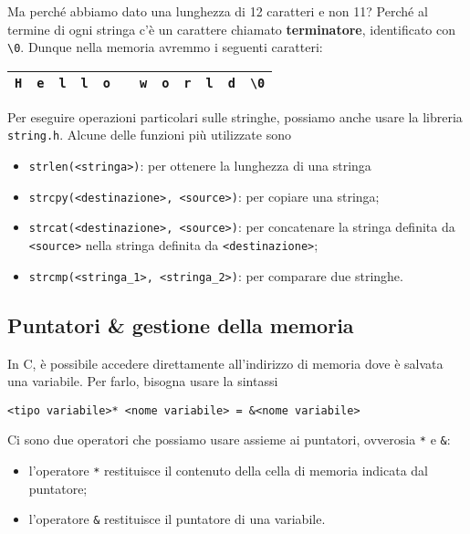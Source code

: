Ma perché abbiamo dato una lunghezza di 12 caratteri e non 11? Perché al termine di ogni stringa c'è un carattere chiamato \textbf{terminatore}, identificato con \verb|\0|. Dunque nella memoria avremmo i seguenti caratteri:

\begin{center}
    \begin{tabular}{|c|c|c|c|c|c|c|c|c|c|c|c|}
        \hline
        \verb|H| & \verb|e| & \verb|l| & \verb|l| & \verb|o| & & \verb|w| & \verb|o| & \verb|r| & \verb|l| & \verb|d| & \verb|\0| \\
        \hline
    \end{tabular}
\end{center}

Per eseguire operazioni particolari sulle stringhe, possiamo anche usare la libreria \verb|string.h|. Alcune delle funzioni più utilizzate sono \begin{itemize}
    \item \verb|strlen(<stringa>)|: per ottenere la lunghezza di una stringa
    \item \verb|strcpy(<destinazione>, <source>)|: per copiare una stringa;
    \item \verb|strcat(<destinazione>, <source>)|: per concatenare la stringa definita da \verb|<source>| nella stringa definita da \verb|<destinazione>|;
    \item \verb|strcmp(<stringa_1>, <stringa_2>)|: per comparare due stringhe.
\end{itemize}

\subsection{Puntatori \texorpdfstring{\&}{&} gestione della memoria}

In C, è possibile accedere direttamente all'indirizzo di memoria dove è salvata una variabile. Per farlo, bisogna usare la sintassi 

\begin{center}
    \verb|<tipo variabile>* <nome variabile> = &<nome variabile>|
\end{center}

Ci sono due operatori che possiamo usare assieme ai puntatori, ovverosia \verb|*| e \verb|&|:
\begin{itemize}
    \item l'operatore \verb|*| restituisce il contenuto della cella di memoria indicata dal puntatore;
    \item l'operatore \verb|&| restituisce il puntatore di una variabile.
\end{itemize}


